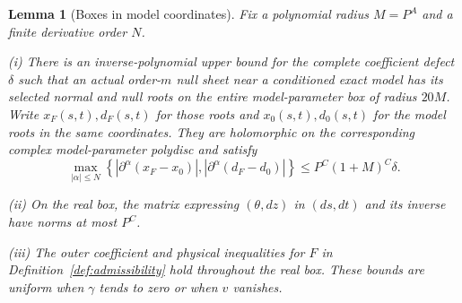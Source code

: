 \documentclass[11pt]{amsart}
\newtheorem{lemma}[theorem]{Lemma}
\theoremstyle{definition}
\theoremstyle{remark}
\numberwithin{equation}{section}
\begin{document}
\begin{lemma}[Boxes in model coordinates]\label{geo:model-box}
Fix a polynomial radius $M=P^A$ and a finite derivative order $N$.

\noindent\textup{(i)} There is an inverse-polynomial upper bound for the complete coefficient defect $\delta$ such that an actual order-$m$ null sheet near a conditioned exact model has its selected normal and null roots on the entire model-parameter box of radius $20M$. Write $x_F(s,t),d_F(s,t)$ for those roots and $x_0(s,t),d_0(s,t)$ for the model roots in the same coordinates. They are holomorphic on the corresponding complex model-parameter polydisc and satisfy
\[
\max_{|\alpha|\le N}\left\{|\partial^\alpha(x_F-x_0)|,|\partial^\alpha(d_F-d_0)|\right\}\le P^C(1+M)^C\delta.
\]

\noindent\textup{(ii)} On the real box, the matrix expressing $(\theta,dz)$ in $(ds,dt)$ and its inverse have norms at most $P^C$.

\noindent\textup{(iii)} The outer coefficient and physical inequalities for $F$ in Definition~\ref{def:admissibility} hold throughout the real box. These bounds are uniform when $\gamma$ tends to zero or when $v$ vanishes.
\end{lemma}
\end{document}
